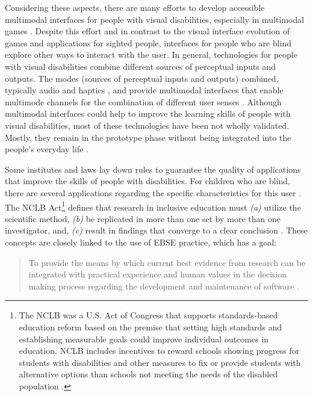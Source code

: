 Considering these aspects, there are many efforts to develop accessible multimodal interfaces for people with visual disabilities, especially in multimodal games \cite{Buaud2002}\cite{Grammenos2006}. Despite this effort and in contrast to the visual interface evolution of games and applications for sighted people, interfaces for people who are blind explore other ways to interact with the user. In general, technologies for people with visual disabilities combine different sources of perceptual inputs and outputs. The modes (sources of perceptual inputs and outputs) combined, typically audio and haptics \cite{Sanchez2014a}, and provide multimodal interfaces that enable multimode channels for the combination of different user senses \cite{Sanchez2015}. Although multimodal interfaces could help to improve the learning skills of people with visual disabilities, most of these technologies have been not wholly validated. Mostly, they remain in the prototype phase without being integrated into the people's everyday life \cite{Goria2016}.

Some institutes and laws lay down rules to guarantee the quality of applications that improve the skills of people with disabilities. For children who are blind, there are several applications regarding the specific characteristics for this user \cite{Sanchez2007science}\cite{Sanchez2005c}\cite{Sancheza}\cite{Sanchez2010b}. The \gls{NCLB} Act\footnote{The \gls{NCLB} was a U.S. Act of Congress that supports standards-based education reform based on the premise that setting high standards and establishing measurable goals could improve individual outcomes in education. \acrshort{NCLB} includes incentives to reward schools showing progress for students with disabilities and other measures to fix or provide students with alternative options than schools not meeting the needs of the disabled population \cite{AlicynFerrell2006}.} defines that research in inclusive education must \textit{(a)} utilize the scientific method, \textit{(b)} be replicated in more than one set by more than one investigator, and, \textit{(c)} result in findings that converge to a clear conclusion \cite{AlicynFerrell2006}. These concepts are closely linked to the use of \gls{EBSE} practice, which has a goal:


\begin{quotation}
To provide the means by which current best evidence from research can be integrated with practical experience and human values in the decision making process regarding the development and maintenance of software \cite{Kitchenham2004a}.
\end{quotation} 

